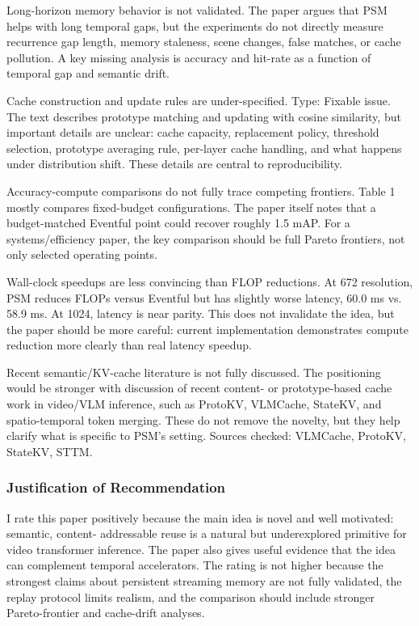 \documentclass[11pt]{article}
\begin{document}
Long-horizon memory behavior is not validated. The paper argues that PSM helps with long temporal gaps, but the experiments do not directly measure recurrence gap length, memory staleness, scene changes, false matches, or cache pollution. A key missing analysis is accuracy and hit-rate as a function of temporal gap and semantic drift.

Cache construction and update rules are under-specified. Type: Fixable issue. The text describes prototype matching and updating with cosine similarity, but important details are unclear: cache capacity, replacement policy, threshold selection, prototype averaging rule, per-layer cache handling, and what happens under distribution shift. These details are central to reproducibility.

Accuracy-compute comparisons do not fully trace competing frontiers. Table 1 mostly compares fixed-budget configurations. The paper itself notes that a budget-matched Eventful point could recover roughly 1.5 mAP. For a systems/efficiency paper, the key comparison should be full Pareto frontiers, not only selected operating points.

Wall-clock speedups are less convincing than FLOP reductions. At 672 resolution, PSM reduces FLOPs versus Eventful but has slightly worse latency, 60.0 ms vs. 58.9 ms. At 1024, latency is near parity. This does not invalidate the idea, but the paper should be more careful: current implementation demonstrates compute reduction more clearly than real latency speedup.

Recent semantic/KV-cache literature is not fully discussed. The positioning would be stronger with discussion of recent content- or prototype-based cache work in video/VLM inference, such as ProtoKV, VLMCache, StateKV, and spatio-temporal token merging. These do not remove the novelty, but they help clarify what is specific to PSM's setting. Sources checked: VLMCache, ProtoKV, StateKV, STTM.

\subsubsection*{Justification of Recommendation}
I rate this paper positively because the main idea is novel and well motivated: semantic, content- addressable reuse is a natural but underexplored primitive for video transformer inference. The paper also gives useful evidence that the idea can complement temporal accelerators. The rating is not higher because the strongest claims about persistent streaming memory are not fully validated, the replay protocol limits realism, and the comparison should include stronger Pareto-frontier and cache-drift analyses.
\end{document}
